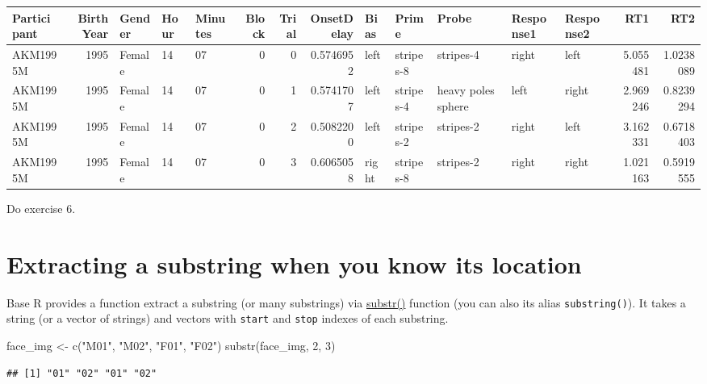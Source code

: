 \documentclass[
]{book}
\newenvironment{Shaded}{\begin{snugshade}}{\end{snugshade}}
\newcommand{\DecValTok}[1]{\textcolor[rgb]{0.00,0.00,0.81}{#1}}
\newcommand{\FunctionTok}[1]{\textcolor[rgb]{0.00,0.00,0.00}{#1}}
\newcommand{\NormalTok}[1]{#1}
\newcommand{\OtherTok}[1]{\textcolor[rgb]{0.56,0.35,0.01}{#1}}
\newcommand{\StringTok}[1]{\textcolor[rgb]{0.31,0.60,0.02}{#1}}
\begin{document}
\begin{tabular}{l|r|l|l|l|r|r|r|l|l|l|l|l|r|r}
\hline
Participant & BirthYear & Gender & Hour & Minutes & Block & Trial & OnsetDelay & Bias & Prime & Probe & Response1 & Response2 & RT1 & RT2\\
\hline
AKM1995M & 1995 & Female & 14 & 07 & 0 & 0 & 0.5746952 & left & stripes-8 & stripes-4 & right & left & 5.055481 & 1.0238089\\
\hline
AKM1995M & 1995 & Female & 14 & 07 & 0 & 1 & 0.5741707 & left & stripes-4 & heavy poles sphere & left & right & 2.969246 & 0.8239294\\
\hline
AKM1995M & 1995 & Female & 14 & 07 & 0 & 2 & 0.5082200 & left & stripes-2 & stripes-2 & right & left & 3.162331 & 0.6718403\\
\hline
AKM1995M & 1995 & Female & 14 & 07 & 0 & 3 & 0.6065058 & right & stripes-8 & stripes-2 & right & right & 1.021163 & 0.5919555\\
\hline
\end{tabular}

Do exercise 6.

\hypertarget{extracting-a-substring-when-you-know-its-location}{%
\section{Extracting a substring when you know its location}\label{extracting-a-substring-when-you-know-its-location}}

Base R provides a function extract a substring (or many substrings) via \href{https://stat.ethz.ch/R-manual/R-patched/library/base/html/substr.html}{substr()} function (you can also its alias \texttt{substring()}). It takes a string (or a vector of strings) and vectors with \texttt{start} and \texttt{stop} indexes of each substring.

\begin{Shaded}
\begin{Highlighting}[]
\NormalTok{face\_img }\OtherTok{\textless{}{-}} \FunctionTok{c}\NormalTok{(}\StringTok{"M01"}\NormalTok{, }\StringTok{"M02"}\NormalTok{, }\StringTok{"F01"}\NormalTok{, }\StringTok{"F02"}\NormalTok{)}
\FunctionTok{substr}\NormalTok{(face\_img, }\DecValTok{2}\NormalTok{, }\DecValTok{3}\NormalTok{)}
\end{Highlighting}
\end{Shaded}

\begin{verbatim}
## [1] "01" "02" "01" "02"
\end{verbatim}
\end{document}
